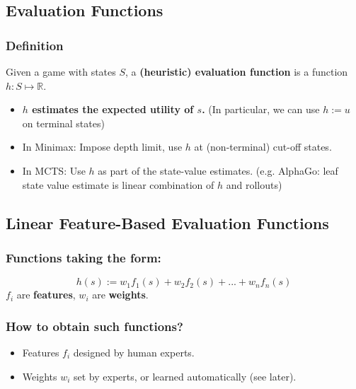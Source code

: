 \documentclass[conference, a4paper]{styles/acmsiggraph}
\begin{document}
    
    
    
    
    
    
    
    
    
    
    \subsection{Evaluation Functions}
        \subsubsection{Definition}
            Given a game with states $S$, a \textbf{(heuristic) evaluation function} is a function $h : S \mapsto \mathbb{R}$.
                \begin{itemize}
                    \item \textbf{$h$ estimates the expected utility of $s$.}
                        (In particular, we can use $h := u$ on terminal states)
                    \item In Minimax: Impose depth limit, use $h$ at (non-terminal) cut-off states.
                    \item In MCTS: Use $h$ as part of the state-value estimates. 
                        (e.g. AlphaGo: leaf state value estimate is linear combination of $h$ and rollouts)
                \end{itemize}
        
    \subsection{Linear Feature-Based Evaluation Functions}
        \subsubsection{Functions taking the form:}
            $$h(s) := w_1f_1(s) + w_2f_2(s) + ... + w_nf_n(s)$$
            $f_i$ are \textbf{features}, $w_i$ are \textbf{weights}.
        
        \subsubsection{How to obtain such functions?}
            \begin{itemize}
                \item Features $f_i$ designed by human experts.
                \item Weights $w_i$ set by experts, or learned automatically (see later).
            \end{itemize}
    
\end{document}
